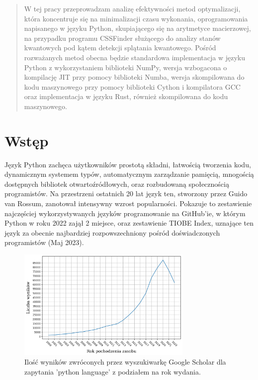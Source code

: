 \documentclass[12pt, a4paper]{article}
\begin{document}
  \begin{sloppypar}
    \begin{abstract}
      W tej pracy przeprowadzam analizę efektywności metod optymalizacji, która
      koncentruje się na minimalizacji czasu wykonania, oprogramowania napisanego w języku
      Python\cite{Python_Language}\cite{ML_Learning_Python}, skupiającego się na
      arytmetyce macierzowej, na przypadku programu CSSFinder służącego do analizy stanów
      kwantowych pod kątem detekcji splątania kwantowego. Pośród rozważanych metod
      obecna będzie standardowa implementacja w języku Python z wykorzystaniem
      biblioteki NumPy\cite{NumPy_Article}\cite{NumPy_Doc}, wersja wzbogacona o kompilację
      JIT przy pomocy biblioteki Numba\cite{Numba_Article}\cite{Numba_Doc}, wersja
      skompilowana do kodu maszynowego przy pomocy biblioteki Cython\cite{Cython_The_Best_Of_Both}\cite{Cython_Org}
      i kompilatora GCC\cite{GCC_Org} oraz implementacja w języku Rust\cite{Rust_Programming_Language},
      również skompilowana do kodu maszynowego.
    \end{abstract}

    \section{Wstęp}


    Język Python zachęca użytkowników prostotą składni, łatwością tworzenia kodu,
    dynamicznym systemem typów, automatycznym zarządzanie pamięcią, mnogością dostępnych
    bibliotek otwartoźródłowych, oraz rozbudowaną społecznością programistów. Na
    przestrzeni ostatnich 20 lat język ten, stworzony przez Guido van Rossum, zanotował
    intensywny wzrost popularności. Pokazuje to zestawienie najczęściej wykorzystywanych
    języków programowanie na GitHub'ie\cite{GitHub_Top_languages}, w którym Python w roku
    2022 zajął 2 miejsce, oraz zestawienie TIOBE Index\cite{TIOBE_Software_Index},
    uznające ten język za obecnie najbardziej rozpowszechniony pośród doświadczonych
    programistów (Maj 2023).

    \FloatBarrier
    \begin{figure}[h]
      \centering
      \includegraphics[width=0.75\textwidth]{"images/python_language_results.png"}
      \caption{Ilość wyników zwróconych przez wyszukiwarkę Google Scholar dla zapytania 'python language' z podziałem na rok wydania.}
    \end{figure}
    \FloatBarrier


\end{sloppypar}
\end{document}
